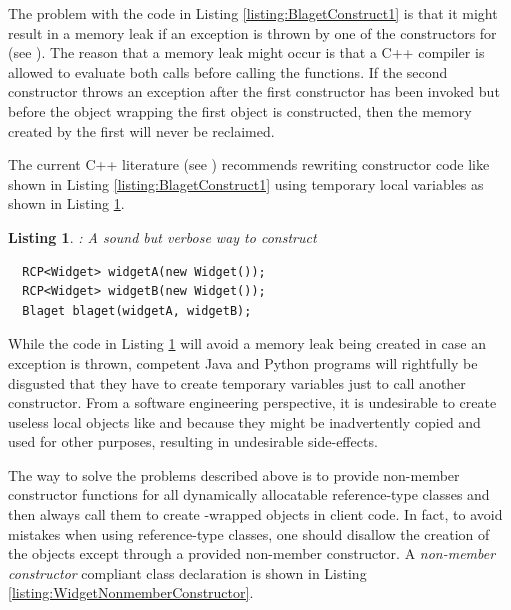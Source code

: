 \documentclass[pdf,ps2pdf,11pt]{SANDreport}
\newtheorem{listing}{Listing}
\begin{document}
The problem with the code in Listing {}\ref{listing:BlagetConstruct1}
is that it might result in a memory leak if an exception is thrown by
one of the constructors for {} (see {}\cite[Item
13]{C++CodingStandards05}).  The reason that a memory leak might occur
is that a C++ compiler is allowed to evaluate both {} calls before calling the {} functions.
If the second constructor {} throws an exception
after the first {} constructor has been invoked
but before the {} object wrapping the first
{} object is constructed, then the memory created by
the first {} will never be reclaimed.

The current C++ literature (see {}\cite[Item
13]{C++CodingStandards05}) recommends rewriting constructor code like
shown in Listing {}\ref{listing:BlagetConstruct1} using temporary local
variables as shown in Listing {}\ref{listing:BlagetConstruct2}.

\begin{listing}: A sound but verbose way to construct \\
\label{listing:BlagetConstruct2}
{\small\begin{verbatim}
  RCP<Widget> widgetA(new Widget());
  RCP<Widget> widgetB(new Widget());
  Blaget blaget(widgetA, widgetB);
\end{verbatim}}
\end{listing}

While the code in Listing {}\ref{listing:BlagetConstruct2} will avoid a
memory leak being created in case an exception is thrown, competent
Java and Python programs will rightfully be disgusted that they have
to create temporary variables just to call another constructor.  From
a software engineering perspective, it is undesirable to create
useless local {} objects like {} and
{} because they might be inadvertently copied and used
for other purposes, resulting in undesirable side-effects.

The way to solve the problems described above is to provide non-member
constructor functions for all dynamically allocatable reference-type
classes and then always call them to create {}-wrapped
objects in client code.  In fact, to avoid mistakes when using
reference-type classes, one should disallow the creation of the
objects except through a provided non-member constructor.  A
{}\textit{non-member constructor} compliant {} class
declaration is shown in Listing
{}\ref{listing:WidgetNonmemberConstructor}.
\end{document}
